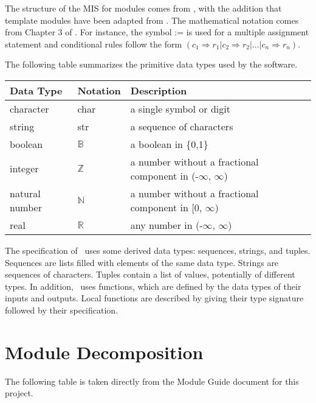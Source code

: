 \documentclass[12pt, titlepage]{article}
\begin{document}

The structure of the MIS for modules comes from \citet{HoffmanAndStrooper1995},
with the addition that template modules have been adapted from
\cite{GhezziEtAl2003}.  The mathematical notation comes from Chapter 3 of
\citet{HoffmanAndStrooper1995}.  For instance, the symbol := is used for a
multiple assignment statement and conditional rules follow the form $(c_1
\Rightarrow r_1 | c_2 \Rightarrow r_2 | ... | c_n \Rightarrow r_n )$.

The following table summarizes the primitive data types used by the \progname software. 

\begin{center}
\renewcommand{\arraystretch}{1.2}
\noindent 
\begin{tabular}{l l p{7.5cm}} 
\toprule 
\textbf{Data Type} & \textbf{Notation} & \textbf{Description}\\ 
\midrule
character & char & a single symbol or digit\\
string & str & a sequence of characters\\
boolean & $\mathbb{B}$ & a boolean in \{0,1\}\\
integer & $\mathbb{Z}$ & a number without a fractional component in (-$\infty$, $\infty$) \\
natural number & $\mathbb{N}$ & a number without a fractional component in [0, $\infty$) \\
real & $\mathbb{R}$ & any number in (-$\infty$, $\infty$)\\
\bottomrule
\end{tabular} 
\end{center}

\noindent
The specification of \progname \ uses some derived data types: sequences, strings, and
tuples. Sequences are lists filled with elements of the same data type. Strings
are sequences of characters. Tuples contain a list of values, potentially of
different types. In addition, \progname \ uses functions, which
are defined by the data types of their inputs and outputs. Local functions are
described by giving their type signature followed by their specification.

\section{Module Decomposition}

The following table is taken directly from the Module Guide document for this project.
\end{document}
